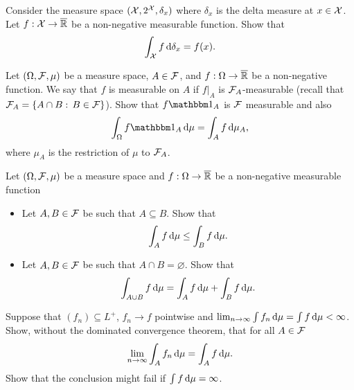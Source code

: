 \begin{problem} Consider the measure space $(\mathcal X, 2^{\mathcal X},\delta_x)$ where $\delta_x$ is the delta measure at $x\in \mathcal X$. Let $f:\mathcal X\to \overline{\mathbb R}$ be a non-negative measurable function. Show that 
\begin{equation*}
    \int_{\mathcal X} f \,\mathrm{d} \delta_x = f(x).
\end{equation*}  
\end{problem}

\begin{problem} Let $(\Omega,\mathcal F,\mu)$ be a measure space, $A\in \mathcal F$, and $f:\Omega\to \overline{\mathbb R}$ be a non-negative  function. We say that $f$ is measurable on $A$ if $f|_{A}$ is $\mathcal F_A$-measurable (recall that $\mathcal F_A = \{A\cap B:\,B\in \mathcal F\}$). Show that $f \indE{A}$ is $\mathcal F$ measurable and also 
\begin{equation*}
    \int_\Omega f  \indE{A} \,\De \mu = \int_A f \,\De \mu_A, 
\end{equation*}
where $\mu_A$ is the restriction of $\mu$ to $\mathcal F_A$.
\end{problem}

\begin{problem}
    Let $(\Omega,\mathcal F,\mu)$ be a measure space and $f:\Omega\to \overline{\mathbb R}$ be a non-negative measurable function
    \begin{itemize}
        \item Let $A,B\in \mathcal F$ be such that $A\subseteq B$. Show that
        \begin{equation*}
            \int_{A} f\,\mathrm{d} \mu \leq  \int_{B} f\,\mathrm{d} \mu.
        \end{equation*}
        \item Let $A,B\in \mathcal F$ be such that $A\cap B = \varnothing$. Show that 
        \begin{equation*}
            \int_{A\cup B} f\,\mathrm{d} \mu =  \int_{A} f\,\mathrm{d} \mu + \int_{B} f\,\mathrm{d} \mu.
        \end{equation*}
    \end{itemize}
\end{problem}

\begin{problem}
     Suppose that $(f_n)\subseteq L^+$, $f_n\to f$ pointwise and $\lim_{n\to\infty} \int f_n\, \mathrm{d}\mu =  \int f\, \mathrm{d}\mu <\infty$. Show, without the dominated convergence theorem, that 
     for all $A\in \mathcal F$
     \begin{equation*}
         \lim_{n\to\infty} \int_A f_n\,\mathrm{d} \mu = \int_A f\,\mathrm{d} \mu.
     \end{equation*}  
     Show that the conclusion might fail if $ \int f\, \mathrm{d}\mu = \infty$.
\end{problem}

